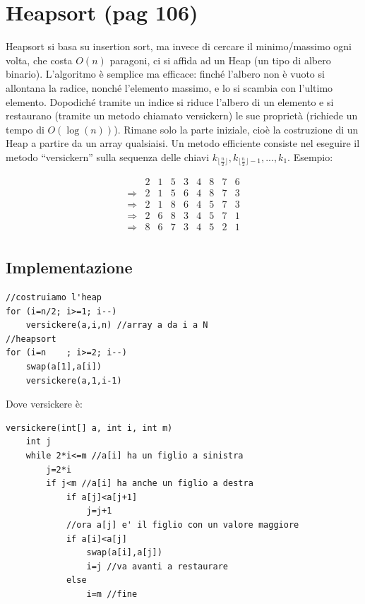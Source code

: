 \documentclass[a4paper]{book}
\begin{document}
\section{Heapsort (pag 106)}
Heapsort si basa su insertion sort, ma invece di cercare il minimo/massimo ogni volta, che costa $O(n)$ paragoni, ci si affida ad un Heap (un tipo di albero binario). L'algoritmo è semplice ma efficace: finché l'albero non è vuoto si allontana la radice, nonché l'elemento massimo, e lo si scambia con l'ultimo elemento. Dopodiché tramite un indice si riduce l'albero di un elemento e si restaurano (tramite un metodo chiamato versickern) le sue proprietà (richiede un tempo di $O(\log (n))$). Rimane solo la parte iniziale, cioè la costruzione di un Heap a partire da un array qualsiaisi. Un metodo efficiente consiste nel eseguire il metodo ``versickern'' sulla sequenza delle chiavi $k_{\lfloor \frac{n}{2} \rfloor}, k_{\lfloor \frac{n}{2} \rfloor - 1}, ... , k_1$. Esempio:

\[\begin{array}{*{20}{c}}
{}&{2}&1&{5}&{3}&4&8&7&6\\
{\Rightarrow}&2&{1}&{5}&{6}&4&8&7&3\\
{\Rightarrow}&2&{1}&{8}&{6}&4&5&7&3\\
{\Rightarrow}&2&{6}&{8}&3&{4}&5&7&1\\
{\Rightarrow}&8&{6}&7&{3}&{4}&5&2&1\\
\end{array}\]

\subsection*{Implementazione}
\begin{lstlisting}
//costruiamo l'heap
for (i=n/2; i>=1; i--)
	versickere(a,i,n) //array a da i a N
//heapsort	
for (i=n	; i>=2; i--)
	swap(a[1],a[i])
	versickere(a,1,i-1)
\end{lstlisting}                                                                          
Dove versickere è:
\begin{lstlisting}
versickere(int[] a, int i, int m)
	int j
	while 2*i<=m //a[i] ha un figlio a sinistra
		j=2*i
		if j<m //a[i] ha anche un figlio a destra
			if a[j]<a[j+1]
				j=j+1
			//ora a[j] e' il figlio con un valore maggiore
			if a[i]<a[j]
				swap(a[i],a[j])
				i=j //va avanti a restaurare
			else
				i=m //fine		
\end{lstlisting}                                                                                                 
\end{document}
